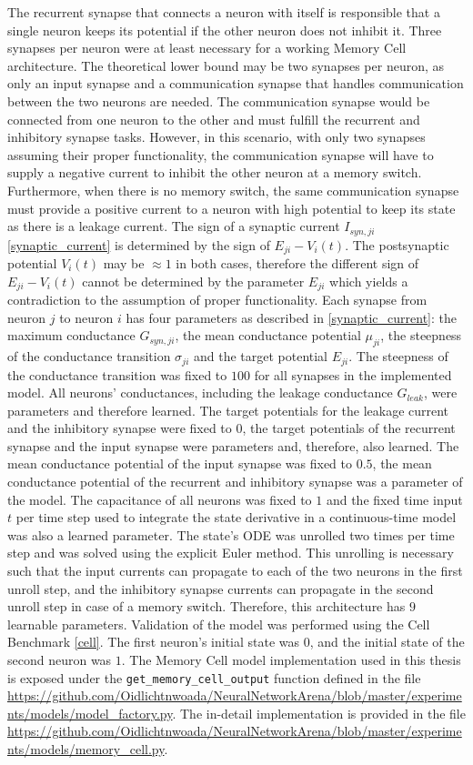 \documentclass[draft,final]{vutinfth} %
\begin{document}
The recurrent synapse that connects a neuron with itself is responsible that a single neuron keeps its potential if the other neuron does not inhibit it.
Three synapses per neuron were at least necessary for a working Memory Cell architecture.
The theoretical lower bound may be two synapses per neuron, as only an input synapse and a communication synapse that handles communication between the two neurons are needed.
The communication synapse would be connected from one neuron to the other and must fulfill the recurrent and inhibitory synapse tasks.
However, in this scenario, with only two synapses assuming their proper functionality, the communication synapse will have to supply a negative current to inhibit the other neuron at a memory switch.
Furthermore, when there is no memory switch, the same communication synapse must provide a positive current to a neuron with high potential to keep its state as there is a leakage current.
The sign of a synaptic current $I_{syn,ji}$ \ref{synaptic_current} is determined by the sign of $E_{ji} - V_i(t)$.
The postsynaptic potential $V_i(t)$ may be $\approx 1$ in both cases, therefore the different sign of $E_{ji} - V_i(t)$ cannot be determined by the parameter $E_{ji}$ which yields a contradiction to the assumption of proper functionality.
Each synapse from neuron $j$ to neuron $i$ has four parameters as described in \ref{synaptic_current}: the maximum conductance $G_{syn,ji}$, the mean conductance potential $\mu_{ji}$, the steepness of the conductance transition $\sigma_{ji}$ and the target potential $E_{ji}$.
The steepness of the conductance transition was fixed to $100$ for all synapses in the implemented model.
All neurons' conductances, including the leakage conductance $G_{leak}$, were parameters and therefore learned.
The target potentials for the leakage current and the inhibitory synapse were fixed to $0$, the target potentials of the recurrent synapse and the input synapse were parameters and, therefore, also learned.
The mean conductance potential of the input synapse was fixed to $0.5$, the mean conductance potential of the recurrent and inhibitory synapse was a parameter of the model.
The capacitance of all neurons was fixed to $1$ and the fixed time input $t$ per time step used to integrate the state derivative in a continuous-time model was also a learned parameter.
The state's ODE was unrolled two times per time step and was solved using the explicit Euler method.
This unrolling is necessary such that the input currents can propagate to each of the two neurons in the first unroll step, and the inhibitory synapse currents can propagate in the second unroll step in case of a memory switch.
Therefore, this architecture has $9$ learnable parameters.
Validation of the model was performed using the Cell Benchmark \ref{cell}.
The first neuron's initial state was $0$, and the initial state of the second neuron was $1$.
The Memory Cell model implementation used in this thesis is exposed under the \texttt{get\_memory\_cell\_output} function defined in the file \url{https://github.com/Oidlichtnwoada/NeuralNetworkArena/blob/master/experiments/models/model_factory.py}.
The in-detail implementation is provided in the file \url{https://github.com/Oidlichtnwoada/NeuralNetworkArena/blob/master/experiments/models/memory_cell.py}.
\end{document}
